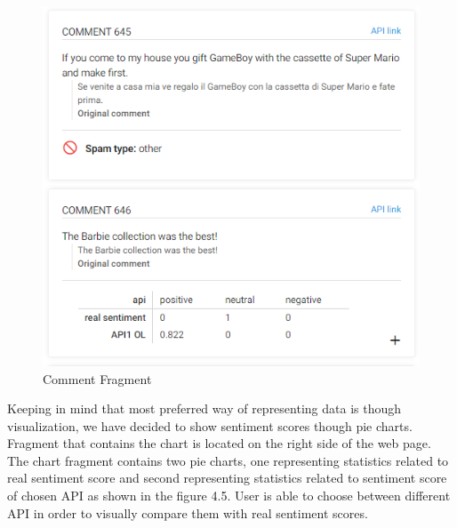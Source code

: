 \newpage

\begin{figure}[ht]
	\centering	
	\includegraphics[width=1\textwidth]{04-framework/03-user-interface/images/comment_fragment.png}
	\caption[Comment Fragment]{Comment Fragment \label{fig:comment-fragment}}
\end{figure}

Keeping in mind that most preferred way of representing data is though visualization, we have decided to show sentiment scores though pie charts. Fragment that contains the chart is located on the right side of the web page. The chart fragment contains two pie charts, one representing statistics related to real sentiment score and second representing statistics related to sentiment score of chosen API as shown in the figure 4.5. User is able to choose between different API in order to visually compare them with real sentiment scores.

\newpage

